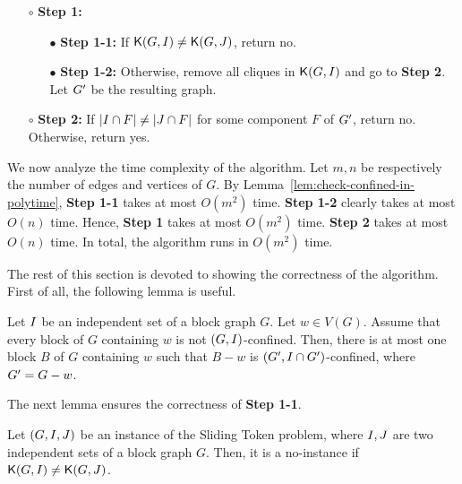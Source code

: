 \documentclass[a4paper]{llncs}
\begin{document}
\begin{itemize}
\item [$\circ$] \textbf{Step 1:}
\begin{itemize}

  \item [$\bullet$] \textbf{Step 1-1:} If ${\mathsf K}{(G, I)} \neq {\mathsf K}{(G, J)}$, return {\sc no}.

  \item [$\bullet$] \textbf{Step 1-2:} Otherwise, remove all cliques in ${\mathsf K}{(G, I)}$ and go to \textbf{Step 2}. Let ${G^\prime}$ be the resulting graph.

\end{itemize}

\noindent
\item [$\circ$] \textbf{Step 2:} If ${\left|I \cap F\right|} \neq {\left|J\cap F\right|}$ for some component $F$ of ${G^\prime}$, return {\sc no}. Otherwise, return {\sc yes}.
\end{itemize}

\noindent
We now analyze the time complexity of the algorithm.
Let $m, n$ be respectively the number of edges and vertices of $G$.
By Lemma~\ref{lem:check-confined-in-polytime}, \textbf{Step 1-1} takes at most $O(m^2)$ time.
\textbf{Step 1-2} clearly takes at most $O(n)$ time.
Hence, \textbf{Step 1} takes at most $O(m^2)$ time.
\textbf{Step 2} takes at most $O(n)$ time.
In total, the algorithm runs in $O(m^2)$ time.

The rest of this section is devoted to showing the correctness of the algorithm.
First of all, the following lemma is useful.

\begin{lemma}
\label{lem:one-block}
Let $I$ be an independent set of a block graph $G$.
Let $w \in V(G)$. 
Assume that every block of $G$ containing $w$ is not $(G, I)$-confined. 
Then, there is at most one block $B$ of $G$ containing $w$ such that $B - w$ is $({G^\prime}, I \cap {G^\prime})$-confined, where ${G^\prime} = G - w$.
\end{lemma}


The next lemma ensures the correctness of \textbf{Step 1-1}.


\begin{lemma}
\label{lem:no-instance}
Let $(G, I, J)$ be an instance of the {\sc Sliding Token} problem, where $I, J$ are two independent sets of a block graph $G$.
Then, it is a {\sc no}-instance if ${\mathsf K}{(G, I)} \neq {\mathsf K}{(G, J)}$.
\end{lemma}
\end{document}
